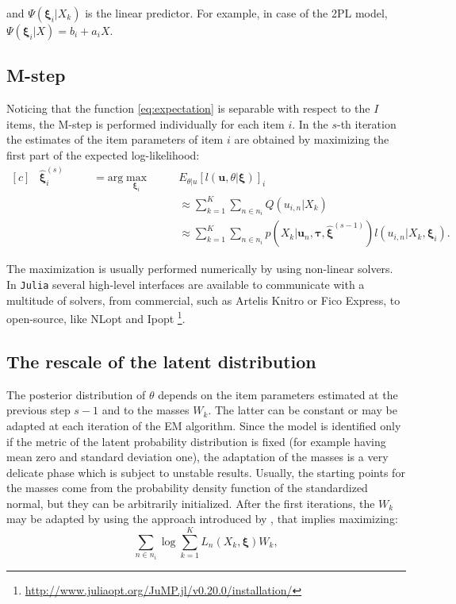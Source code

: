 \noindent and $\Psi(\boldsymbol{\xi}_i| X_k)$ is the linear predictor. For example, in case of the 2PL model, $\Psi(\boldsymbol{\xi}_i|X)=b_i+a_iX$.

\subsection{M-step}
Noticing that the function \eqref{eq:expectation} is separable with respect to the $I$ items, the M-step is performed individually for each item $i$. In the $s$-th iteration the estimates of the item parameters of item $i$ are obtained by maximizing the first part of the expected log-likelihood:
\begin{equation}\label{eq:M-step}
\begin{aligned}[c]
& \hat{\boldsymbol{\xi}}_i^{(s)} && \quad = \text{arg}\max_{\boldsymbol{\xi}_i} \quad &&  E_{\theta|u}\left[\mathit{l}(\mathbf{u},\theta|\boldsymbol{\xi})\right]_i \\
& && && \approx \sum_{k=1}^K{\sum_{n \in n_i}{Q(u_{i,n}|X_k)}} \\ 
& && && \approx \sum_{k=1}^K\sum_{n \in n_i}{p(X_k|\mathbf{u}_n,\boldsymbol{\tau},\hat{\boldsymbol{\xi}}^{(s-1)})\mathit{l}(u_{i,n}|X_k,\boldsymbol{\xi}_i)}.
\end{aligned}
\end{equation}

The maximization is usually performed numerically by using non-linear solvers. In \texttt{Julia} several high-level interfaces are available to communicate with a multitude of solvers, from commercial, such as Artelis Knitro or Fico Express, to open-source, like NLopt and Ipopt \footnote{\url{http://www.juliaopt.org/JuMP.jl/v0.20.0/installation/}}.

\subsection{The rescale of the latent distribution}

The posterior distribution of $\theta$ depends on the item parameters estimated at the previous step $s-1$ and to the masses $W_k$. The latter can be constant or may be adapted at each iteration of the EM algorithm. Since the model is identified only if the metric of the latent probability distribution is fixed (for example having mean zero and standard deviation one), the adaptation of the masses is a very delicate phase which is subject to unstable results. Usually, the starting points for the masses come from the probability density function of the standardized normal, but they can be arbitrarily initialized. After the first iterations, the $W_k$ may be adapted by using the approach introduced by \textcite{mislevy1984estimating}, that implies maximizing:
\begin{equation}\label{eq:maxWk}
\sum_{n \in n_i}{\log{\sum_{k=1}^K{{\mathit{L_n}(X_k,\boldsymbol{\xi})}W_k}}}, 
\end{equation} 

